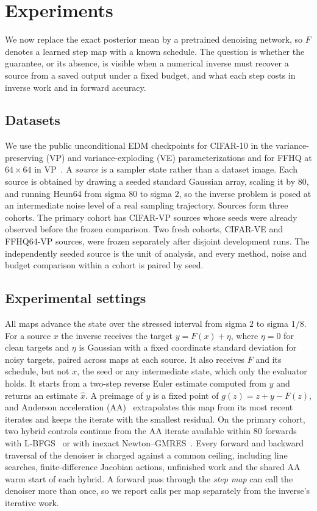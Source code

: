 \section{Experiments}
\label{sec:experiment}
We now replace the exact posterior mean by a pretrained denoising network, so $F$ denotes a learned step map with a known schedule. The question is whether the guarantee, or its absence, is visible when a numerical inverse must recover a source from a saved output under a fixed budget, and what each step costs in inverse work and in forward accuracy.

\subsection{Datasets}
\label{sec:datasets}
We use the public unconditional EDM checkpoints for CIFAR-10 in the variance-preserving (VP) and variance-exploding (VE) parameterizations and for FFHQ at $64\times64$ in VP~\cite{karras2022,cifar2009,karras2019}. A \emph{source} is a sampler state rather than a dataset image. Each source is obtained by drawing a seeded standard Gaussian array, scaling it by $80$, and running Heun64 from sigma $80$ to sigma $2$, so the inverse problem is posed at an intermediate noise level of a real sampling trajectory. Sources form three cohorts. The primary cohort has \PrimaryN{} CIFAR-VP sources whose seeds were already observed before the frozen comparison. Two fresh cohorts, \VEN{} CIFAR-VE and \FFHQN{} FFHQ64-VP sources, were frozen separately after disjoint development runs. The independently seeded source is the unit of analysis, and every method, noise and budget comparison within a cohort is paired by seed.

\subsection{Experimental settings}
\label{sec:settings}
All maps advance the state over the stressed interval from sigma $2$ to sigma $1/8$. For a source $x$ the inverse receives the target $y=F(x)+\eta$, where $\eta=0$ for clean targets and $\eta$ is Gaussian with a fixed coordinate standard deviation for noisy targets, paired across maps at each source. It also receives $F$ and its schedule, but not $x$, the seed or any intermediate state, which only the evaluator holds. It starts from a two-step reverse Euler estimate computed from $y$ and returns an estimate $\widehat x$. A preimage of $y$ is a fixed point of $g(z)=z+y-F(z)$, and Anderson acceleration (AA)~\cite{walker2011} extrapolates this map from its most recent iterates and keeps the iterate with the smallest residual. On the primary cohort, two hybrid controls continue from the AA iterate available within 80 forwards with L-BFGS~\cite{liu1989} or with inexact Newton--GMRES~\cite{saad1986}. Every forward and backward traversal of the denoiser is charged against a common ceiling, including line searches, finite-difference Jacobian actions, unfinished work and the shared AA warm start of each hybrid. A forward pass through the \emph{step map} can call the denoiser more than once, so we report calls per map separately from the inverse's iterative work.

